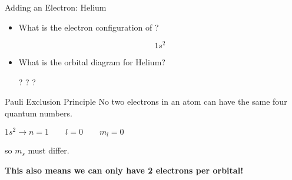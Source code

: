 \documentclass[notes=onlyslideswithnotes,notes=hide]{beamer}
\begin{document}
\begin{frame}{Adding an Electron: Helium}
	\begin{itemize}
		\item What is the electron configuration of ?

			\pause%

			\begin{equation*}
				1s^2
			\end{equation*}

			\pause%

		\item What is the orbital diagram for Helium?

			\pause%

			\begin{center}
				\electron{$\upharpoonleft\upharpoonright$}?
				\qquad
				\pause%
				\electron{$\upharpoonleft\downharpoonright$}?
				\qquad
				\pause%
				\electron{$\downharpoonleft\downharpoonright$}?
			\end{center}
	\end{itemize}

	\pause%

	\begin{block}{Pauli Exclusion Principle}
		No two electrons in an atom can have the same four quantum
		numbers.
	\end{block}

	\pause%

	\begin{center}
		$1s^2 \rightarrow n = 1 \qquad l = 0 \qquad m_l = 0$

		so $m_s$ \alert{must} differ.

		\pause%

		\textbf{This also means we can only have 2 electrons per orbital!}
	\end{center}
\end{frame}
\end{document}
